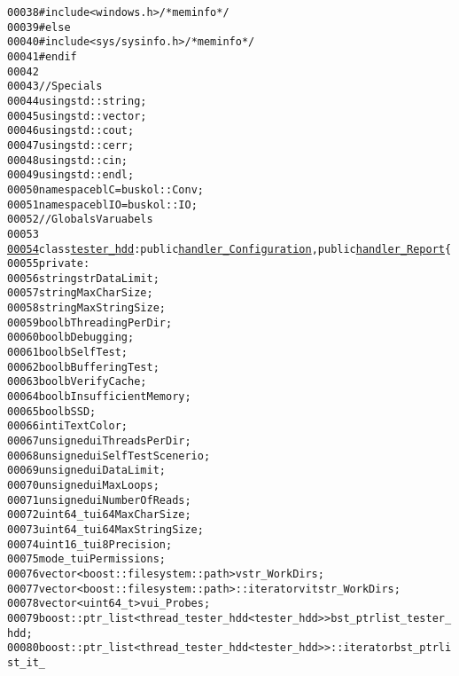 \begin{footnotesize}
\begin{alltt}
00038 \textcolor{preprocessor}{}\textcolor{preprocessor}{    #include <windows.h>}\textcolor{comment}{/*mem info*/}
00039 \textcolor{preprocessor}{#else}
00040 \textcolor{preprocessor}{}\textcolor{preprocessor}{    #include <sys/sysinfo.h>}\textcolor{comment}{/*mem info*/}
00041 \textcolor{preprocessor}{#endif}
00042 \textcolor{preprocessor}{}
00043 \textcolor{comment}{//Specials}
00044 \textcolor{keyword}{using} std::string;
00045 \textcolor{keyword}{using} std::vector;
00046 \textcolor{keyword}{using} std::cout;
00047 \textcolor{keyword}{using} std::cerr;
00048 \textcolor{keyword}{using} std::cin;
00049 \textcolor{keyword}{using} std::endl;
00050 \textcolor{keyword}{namespace }blC = buskol::Conv;
00051 \textcolor{keyword}{namespace }blIO = buskol::IO;
00052 \textcolor{comment}{//Globals Varuabels}
00053 
\hypertarget{tester__hdd_8hpp_source_l00054}{}\hyperlink{classtester__hdd}{00054} \textcolor{keyword}{class }\hyperlink{classtester__hdd}{tester_hdd}: \textcolor{keyword}{public} \hyperlink{classhandler__Configuration}{handler_Configuration}, \textcolor{keyword}{public} \hyperlink{classhandler__Report}{handler_Report}\{
00055     \textcolor{keyword}{private}:
00056         \textcolor{keywordtype}{string} strDataLimit; 
00057         \textcolor{keywordtype}{string} MaxCharSize; 
00058         \textcolor{keywordtype}{string} MaxStringSize; 
00059         \textcolor{keywordtype}{bool} bThreadingPerDir; 
00060         \textcolor{keywordtype}{bool} bDebugging; 
00061         \textcolor{keywordtype}{bool} bSelfTest;
00062         \textcolor{keywordtype}{bool} bBufferingTest;
00063         \textcolor{keywordtype}{bool} bVerifyCache;
00064         \textcolor{keywordtype}{bool} bInsufficientMemory;
00065         \textcolor{keywordtype}{bool} bSSD;
00066         \textcolor{keywordtype}{int} iTextColor;
00067         \textcolor{keywordtype}{unsigned} uiThreadsPerDir; 
00068         \textcolor{keywordtype}{unsigned} uiSelfTestScenerio; 
00069         \textcolor{keywordtype}{unsigned} uiDataLimit; 
00070         \textcolor{keywordtype}{unsigned} uiMaxLoops;
00071         \textcolor{keywordtype}{unsigned} uiNumberOfReads;
00072         uint64\_t ui64MaxCharSize;
00073         uint64\_t ui64MaxStringSize;
00074         uint16\_t ui8Precision;
00075         mode\_t uiPermissions; 
00076         vector<boost::filesystem::path> vstr\_WorkDirs; 
00077         vector<boost::filesystem::path>::iterator vitstr\_WorkDirs; 
00078         vector<uint64\_t> vui\_Probes;
00079         boost::ptr\_list<thread\_tester\_hdd<tester\_hdd> > bst\_ptrlist\_tester\_hdd; 
00080         boost::ptr\_list<thread\_tester\_hdd<tester\_hdd> >::iterator bst\_ptrlist\_it\_

\end{alltt}
\end{footnotesize}
